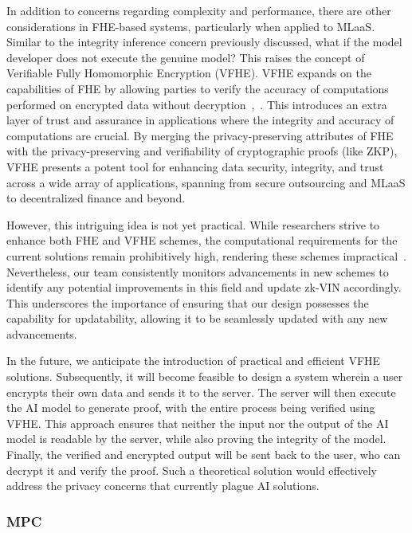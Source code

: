 \documentclass[conference]{IEEEtran}
\begin{document}
In addition to concerns regarding complexity and performance, there are other considerations in FHE-based systems, particularly when applied to MLaaS. Similar to the integrity inference concern previously discussed, what if the model developer does not execute the genuine model? This raises the concept of Verifiable Fully Homomorphic Encryption (VFHE). VFHE expands on the capabilities of FHE by allowing parties to verify the accuracy of computations performed on encrypted data without decryption~\cite{Viand2023VerifiableFH},~\cite{Chatel2022VerifiableEF}. This introduces an extra layer of trust and assurance in applications where the integrity and accuracy of computations are crucial. By merging the privacy-preserving attributes of FHE with the privacy-preserving and verifiability of cryptographic proofs (like ZKP), VFHE presents a potent tool for enhancing data security, integrity, and trust across a wide array of applications, spanning from secure outsourcing and MLaaS to decentralized finance and beyond.

However, this intriguing idea is not yet practical. While researchers strive to enhance both FHE and VFHE schemes, the computational requirements for the current solutions remain prohibitively high, rendering these schemes impractical~\cite{Atapoor2024VerifiableFV}. Nevertheless, our team consistently monitors advancements in new schemes to identify any potential improvements in this field and update zk-VIN accordingly. This underscores the importance of ensuring that our design possesses the capability for updatability, allowing it to be seamlessly updated with any new advancements.

In the future, we anticipate the introduction of practical and efficient VFHE solutions. Subsequently, it will become feasible to design a system wherein a user encrypts their own data and sends it to the server. The server will then execute the AI model to generate proof, with the entire process being verified using VFHE. This approach ensures that neither the input nor the output of the AI model is readable by the server, while also proving the integrity of the model. Finally, the verified and encrypted output will be sent back to the user, who can decrypt it and verify the proof. Such a theoretical solution would effectively address the privacy concerns that currently plague AI solutions.


\subsubsection{MPC}
\end{document}

